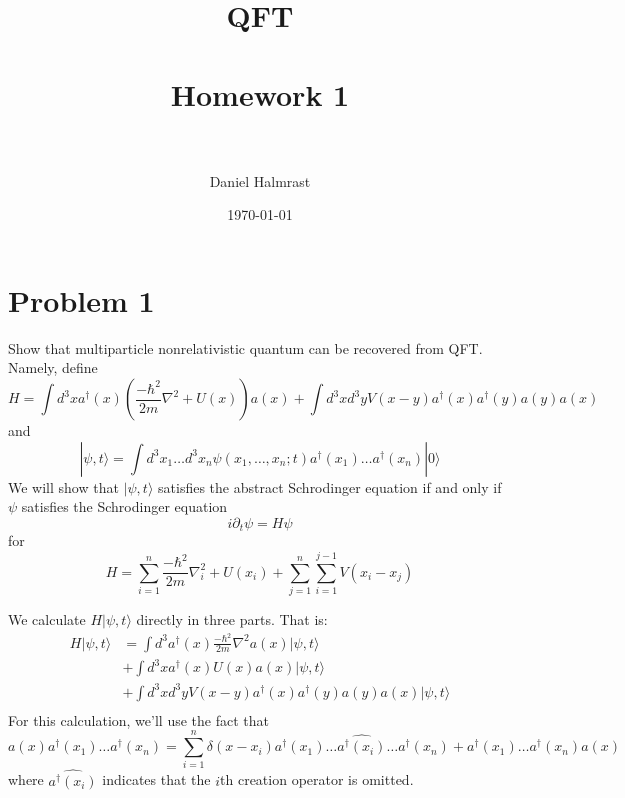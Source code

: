 \documentclass[fontsize=11pt]{scrartcl} %
\title{	
\normalfont \normalsize 
\textsc{QFT} \\ [25pt] %
\horrule{0.5pt} \\[0.4cm] %
\huge Homework 1 \\ %
\horrule{2pt} \\[0.5cm] %
}
\author{Daniel Halmrast} %
\date{\normalsize\today} %
\numberwithin{equation}{section} %
\numberwithin{figure}{section} %
\numberwithin{table}{section} %
\newcommand{\ad}{a^{\dagger}}
\begin{document}
\maketitle %

\section*{Problem 1}
Show that multiparticle nonrelativistic quantum can be recovered from QFT.
Namely, define
\[
    H = \int d^3x\ad(x)\left( \frac{-\hbar^2}{2m}\nabla^2 + U(x)
    \right)a(x) + \int d^3xd^3yV(x-y)\ad(x)\ad(y)a(y)a(x)
\]
and
\[
    |\psi,t\rangle = \int d^3x_1\dots d^3x_n
    \psi(x_1,\dots,x_n;t)\ad(x_1)\dots\ad(x_n)|0\rangle
\]
We will show that $|\psi,t\rangle$ satisfies the abstract Schrodinger equation
if and only if $\psi$ satisfies the Schrodinger equation
\[
    i\partial_t\psi = H\psi
\]
for
\[
    H = \sum_{i=1}^n \frac{-\hbar^2}{2m}\nabla^2_i + U(x_i) +
    \sum_{j=1}^n\sum_{i=1}^{j-1}V(x_i-x_j)
\]

We calculate $H|\psi,t\rangle$ directly in three parts. That is:
\[
    \begin{aligned}
    H|\psi,t\rangle &= 
    \int d^3\ad(x)\frac{-\hbar^2}{2m}\nabla^2a(x)|\psi,t\rangle\\
        &+ \int d^3x \ad(x)U(x)a(x)|\psi,t\rangle\\
        &+ \int d^3xd^3yV(x-y)\ad(x)\ad(y)a(y)a(x)|\psi,t\rangle\\
    \end{aligned}
\]
For this calculation, we'll use the fact that
\[
    a(x)\ad(x_1)\dots\ad(x_n) =
    \sum_{i=1}^n\delta(x-x_i)\ad(x_1)\dots\hat{\ad(x_i)}\dots\ad(x_n) +
    \ad(x_1)\dots\ad(x_n)a(x)
\]
where $\hat{\ad(x_i)}$ indicates that the $i$th creation operator is omitted.
\end{document}

